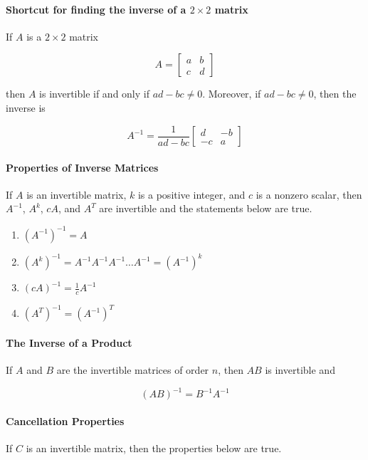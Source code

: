 \documentclass{report}
\begin{document}
\paragraph{Shortcut for finding the inverse of a $2\times2$ matrix} If $A$ is a $2 \times 2$ matrix

\[
A
=
\begin{bmatrix}
    a & b \\
    c & d
\end{bmatrix}
\]

\noindent then $A$ is invertible if and only if $ad-bc \ne 0$. Moreover, if $ad-bc \ne 0$, then the inverse is

\[
A^{-1}
=
\frac{1}{ad-bc}
\begin{bmatrix}
    d & -b\\
    -c & a
\end{bmatrix}
\]

\paragraph{Properties of Inverse Matrices}

If $A$ is an invertible matrix, $k$ is a positive integer, and $c$ is a nonzero scalar, then $A^{-1}$, $A^k$, $cA$, and $A^T$ are invertible and the statements below are true.

\begin{enumerate}
    \item $(A^{-1})^{-1} = A$
    \item $\left( A^k \right) ^{-1} = A^{-1}A^{-1}A^{-1} \hdots A^{-1} = \left( A^{-1} \right) ^ k$
    \item $\left( cA \right)^{-1} = \frac{1}{c} A^{-1}$
    \item $\left( A^T \right)^{-1} = \left( A^{-1} \right)^T$
\end{enumerate}

\paragraph{The Inverse of a Product}
If $A$ and $B$ are the invertible matrices of order $n$, then $AB$ is invertible and 

$$
(AB)^{-1} = B^{-1}A^{-1}
$$

\paragraph{Cancellation Properties} 
If $C$ is an invertible matrix, then the properties below are true.
\end{document}
